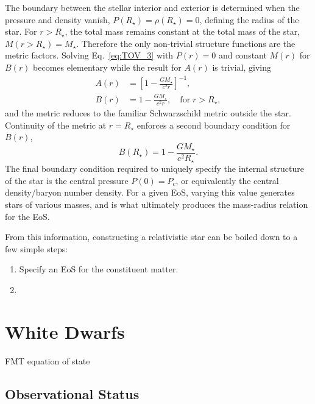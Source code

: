 The boundary between the stellar interior and exterior is determined when the pressure and density vanish, $P(R_\star) = \rho(R_\star) = 0$, defining the radius of the star. For $r>R_\star$, the total mass remains constant at the total mass of the star, $M(r>R_\star) = M_\star$.
Therefore the only non-trivial structure functions are the metric factors. Solving Eq.~\ref{eq:TOV_3} with $P(r)=0$ and constant $M(r)$ for $B(r)$ becomes elementary while the result for $A(r)$ is trivial, giving
\begin{align}
    A(r) & = \left[ 1 - \frac{G M_\star}{c^2 r} \right]^{-1},\\
    B(r) & = 1 - \frac{G M_\star}{c^2 r} ,\quad\mathrm{for}\;r > R_\star,
\end{align}
and the metric reduces to the familiar Schwarzschild metric outside the star. 
Continuity of the metric at $r= R_\star$ enforces a second boundary condition for $B(r)$,
\begin{equation}
    B(R_\star) = 1 - \frac{G M_\star}{c^2 R_\star}.
\end{equation}
The final boundary condition required to uniquely specify the internal structure of the star is the central pressure $P(0) = P_c$, or equivalently the central density/baryon number density. For a given EoS, varying this value generates stars of various masses, and is what ultimately produces the mass-radius relation for the EoS.

From this information, constructing a relativistic star can be boiled down to a few simple steps:
\begin{enumerate}
    \item Specify an EoS for the constituent matter.
    \item 
\end{enumerate}

\section{White Dwarfs}

FMT equation of state

\subsection{Observational Status}

